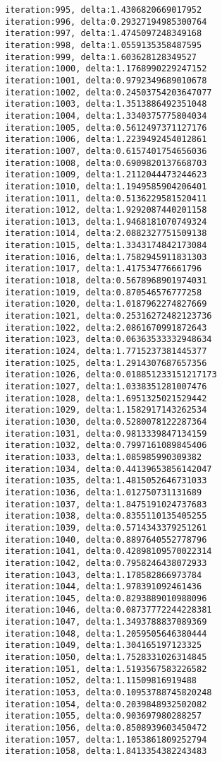 \documentclass[11pt]{article}
\begin{document}
\begin{Verbatim}[commandchars=\\\{\}]
iteration:995, delta:1.4306820669017952
iteration:996, delta:0.29327194985300764
iteration:997, delta:1.4745097248349168
iteration:998, delta:1.0559135358487595
iteration:999, delta:1.603628128349527
iteration:1000, delta:1.1768990229247152
iteration:1001, delta:0.9792349689010678
iteration:1002, delta:0.24503754203647077
iteration:1003, delta:1.3513886492351048
iteration:1004, delta:1.3340375775804034
iteration:1005, delta:0.5612497371127176
iteration:1006, delta:1.2239492454012861
iteration:1007, delta:0.6157401754656036
iteration:1008, delta:0.6909820137668703
iteration:1009, delta:1.2112044473244623
iteration:1010, delta:1.1949585904206401
iteration:1011, delta:0.5136229581520411
iteration:1012, delta:1.9292087440201158
iteration:1013, delta:1.9468181070749324
iteration:1014, delta:2.0882327751509138
iteration:1015, delta:1.3343174842173084
iteration:1016, delta:1.7582945911831303
iteration:1017, delta:1.417534776661796
iteration:1018, delta:0.5678968901974031
iteration:1019, delta:0.870546576777258
iteration:1020, delta:1.0187962274827669
iteration:1021, delta:0.25316272482123736
iteration:1022, delta:2.0861670991872643
iteration:1023, delta:0.06363533332948634
iteration:1024, delta:1.7715237381445377
iteration:1025, delta:1.2914307687657356
iteration:1026, delta:0.018851233151217173
iteration:1027, delta:1.0338351281007476
iteration:1028, delta:1.6951325021529442
iteration:1029, delta:1.1582917143262534
iteration:1030, delta:0.5280078122287364
iteration:1031, delta:0.9813339847134159
iteration:1032, delta:0.7997161089845406
iteration:1033, delta:1.085985990309382
iteration:1034, delta:0.44139653856142047
iteration:1035, delta:1.4815052646731033
iteration:1036, delta:1.012750731131689
iteration:1037, delta:1.8475191024737683
iteration:1038, delta:0.8355110135405255
iteration:1039, delta:0.5714343379251261
iteration:1040, delta:0.8897640552778796
iteration:1041, delta:0.42898109570022314
iteration:1042, delta:0.7958246438072933
iteration:1043, delta:1.178582866973784
iteration:1044, delta:1.978391092461436
iteration:1045, delta:0.8293889010988096
iteration:1046, delta:0.08737772244228381
iteration:1047, delta:1.3493788837089369
iteration:1048, delta:1.2059505646380444
iteration:1049, delta:1.304165197123325
iteration:1050, delta:1.7528331026314845
iteration:1051, delta:1.5193567583226582
iteration:1052, delta:1.11509816919488
iteration:1053, delta:0.10953788745820248
iteration:1054, delta:0.2039848932502082
iteration:1055, delta:0.903697980288257
iteration:1056, delta:0.8508939603450472
iteration:1057, delta:1.1053861809252794
iteration:1058, delta:1.8413354382243483

\end{Verbatim}
\end{document}
